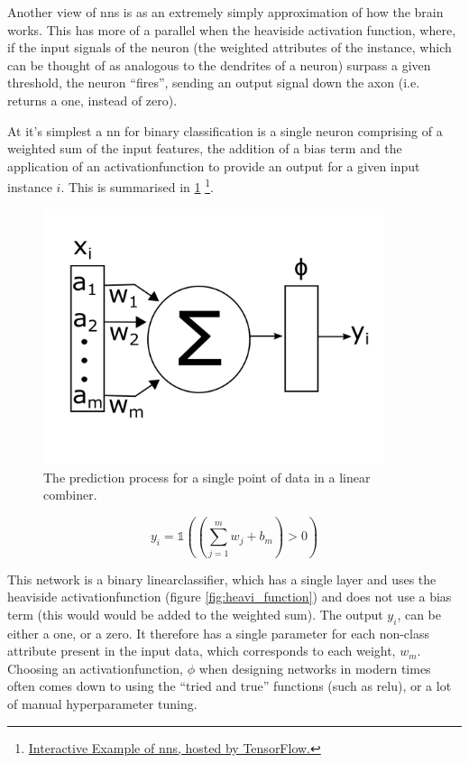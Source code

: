 Another view of \gls{nn}s is as an extremely simply approximation of how the brain works. This has more of a parallel when the heaviside activation function, where, if the input signals of the neuron (the weighted attributes of the \gls{instance}, which can be thought of as analogous to the dendrites of a neuron) surpass a given threshold, the neuron \enquote{fires}, sending an output signal down the axon (i.e. returns a one, instead of zero).
\bigskip

At it's simplest a \gls{nn} for binary classification is a single \gls{neuron} comprising of a weighted sum of the input features, the addition of a bias term and the application of an \gls{activationfunction} to provide an output for a given input \gls{instance} $i$. This is summarised in \ref{fig:nn_simple} \footnote{\href{https://playground.tensorflow.org/}{Interactive Example of \gls{nn}s, hosted by TensorFlow.}}.  
\bigskip

\begin{figure}[H]
    \centering
    \includegraphics[width=100mm]{figs/nn_simple.png}
    \caption{The prediction process for a single point of data in a linear combiner.}
    \label{fig:nn_simple}
\end{figure}

\begin{equation}
    y_i = \mathds{1} ((\sum_{j = 1}^m w_j + b_m) > 0)
    \label{eq:nn_simple_pred}
\end{equation}

This network is a binary \gls{linearclassifier}, which has a single \gls{layer} and uses the heaviside \gls{activationfunction} (figure \ref{fig:heavi_function}) and does not use a bias term (this would would be added to the weighted sum). The output $y_i$, can be either a one, or a zero. It therefore has a single parameter for each non-class attribute present in the input data, which corresponds to each weight, $w_m$. Choosing an \gls{activationfunction}, $\phi$ when designing networks in modern times often comes down to using the \enquote{tried and true} functions (such as \gls{relu}), or a lot of manual \gls{hyperparameter} tuning.

